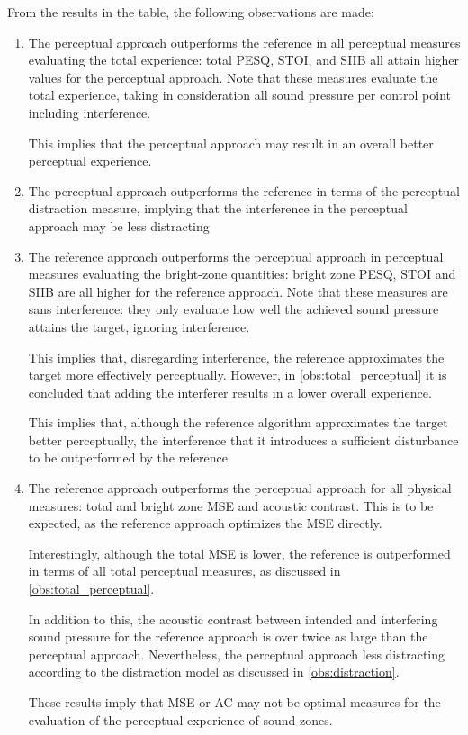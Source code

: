 From the results in the table, the following observations are made:
\begin{enumerate}
    \item The perceptual approach outperforms the reference in all perceptual measures evaluating the total experience:
        total PESQ, STOI, and SIIB all attain higher values for the perceptual approach.
        Note that these measures evaluate the total experience, taking in consideration all sound pressure per control 
        point including interference.

        This implies that the perceptual approach may result in an overall better perceptual experience.
        \label{obs:total_perceptual}

    \item The perceptual approach outperforms the reference in terms of the perceptual distraction measure,
        implying that the interference in the perceptual approach may be less distracting 
        \label{obs:distraction}

    \item The reference approach outperforms the perceptual approach in perceptual measures evaluating the 
        bright-zone quantities: bright zone PESQ, STOI and SIIB are all higher for the reference approach.
        Note that these measures are sans interference: they only evaluate how well the achieved sound pressure
        attains the target, ignoring interference.

        This implies that, disregarding interference, the reference approximates the target more effectively 
        perceptually.
        However, in \autoref{obs:total_perceptual} it is concluded that adding the interferer results in a 
        lower overall experience.

        This implies that, although the reference algorithm approximates the target better perceptually, 
        the interference that it introduces a sufficient disturbance to be outperformed by the reference.
        \label{obs:bright_zone_perceptual}

    \item The reference approach outperforms the perceptual approach for all physical measures: 
        total and bright zone MSE and acoustic contrast.
        This is to be expected, as the reference approach optimizes the MSE directly.

        Interestingly, although the total MSE is lower, the reference is outperformed in terms of all total perceptual 
        measures, as discussed in \autoref{obs:total_perceptual}.

        In addition to this, the acoustic contrast between intended and interfering sound pressure for 
        the reference approach is over twice as large than the perceptual approach.
        Nevertheless, the perceptual approach less distracting according to the distraction model as 
        discussed in \autoref{obs:distraction}.

        These results imply that MSE or AC may not be optimal measures for the evaluation of the  
        perceptual experience of sound zones.
        \label{obs:physical}
\end{enumerate}

